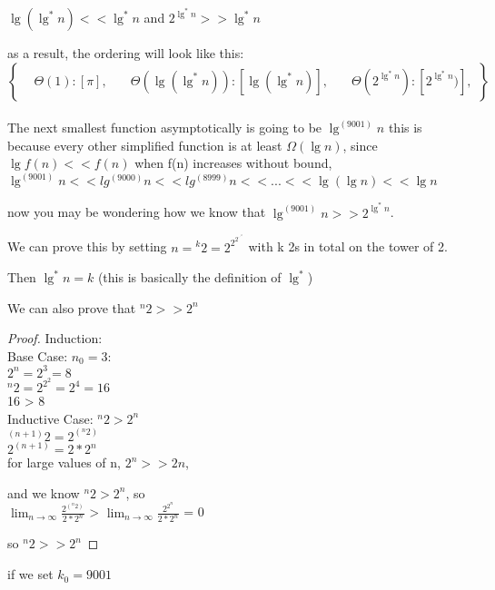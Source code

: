 \documentclass[11pt,fleqn]{article}
\theoremstyle{definition}
\theoremstyle{remark}
\begin{document}
$\lg(\lg^*n) << \lg^*n$ and $2^{\lg^*n} >> \lg^*n$

as a result, the ordering will look like this:\\

\[
\left\{
\begin{aligned}
& \Theta(1): [\pi],
& \quad \Theta(\lg(\lg^*n)): [\lg(\lg^*n)],
& \quad \Theta(2^{\lg^*n}): [2^{\lg^*n})],
\end{aligned}
\right\}
\]\\

The next smallest function asymptotically is going to be $\lg^{(9001)} n$
this is because every other simplified function is at least $\Omega(\lg n)$,
since $\lg{f(n)} << f(n)$ when f(n) increases without bound, 
$\lg^{(9001)} n << lg^{(9000)} n << lg^{(8999)} n << ... << \lg (\lg n) << \lg n$ 

now you may be wondering how we know that $\lg^{(9001)} n >> 2^{\lg^*n}$.

We can prove this by setting $n = {}^k 2 = 2^{2^{2^{\cdot^{\cdot^{\cdot 2}}}}}$ with k
2s in total on the tower of 2.

Then $\lg^*n = k$ (this is basically the definition of $\lg^*$)

We can also prove that ${}^n 2 >> 2^n$

\begin{proof}
Induction:\\

Base Case: $n_0 = 3$:\\
$2^n = 2^3 = 8$\\
${}^n 2 = 2^{2^2} = 2^4 = 16$\\
16 > 8\\

Inductive Case: ${}^n 2 > 2^n$\\
${}^{(n+1)} 2 = 2^{({}^n 2)}$\\
$2^{(n+1)} = 2 * 2^n$\\

for large values of n, $2^n >> 2n$,

and we know ${}^n 2 > 2^n$, so\\

$\lim_{n \to \infty} \frac{2^{({}^n 2)}}{2*2^n}$ >
$\lim_{n \to \infty} \frac{2^{2^n}}{2*2^n}$ = 0

so ${}^n 2 >> 2^n$

\end{proof}



if we set $k_0 = 9001$
\end{document}
